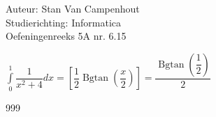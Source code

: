 \documentclass[a4paper]{article}
\begin{document}
  
\noindent \large Auteur: Stan Van Campenhout \\
\noindent \large Studierichting:  Informatica\\
\noindent \large Oefeningenreeks 5A nr. 6.15\\

\medskip

\normalsize

$ \displaystyle\int\limits_0^1\dfrac{1}{x^2+4} dx =\left[\dfrac{1}{2}\operatorname{Bgtan}\left(\dfrac{x}{2}\right)\right] 
= \dfrac{\operatorname{Bgtan}\left(\dfrac{1}{2}\right)}{2} $\\

\begin{thebibliography}{999}
\end{thebibliography}
\end{document}
